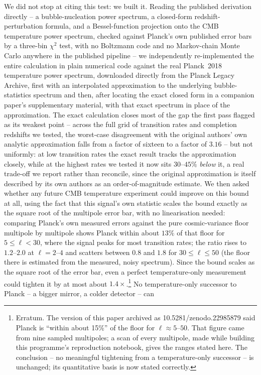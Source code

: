 \documentclass[11pt,a4paper]{article}
\begin{document}
We did not stop at citing this test: we built it. Reading the published derivation directly -- a
bubble-nucleation power spectrum, a closed-form redshift-perturbation formula, and a Bessel-function
projection onto the CMB temperature power spectrum, checked against Planck's own published error bars
by a three-bin $\chi^2$ test, with no Boltzmann code and no Markov-chain Monte Carlo anywhere in the
published pipeline -- we independently re-implemented the entire calculation in plain numerical code
against the real Planck~2018 temperature power spectrum, downloaded directly from the Planck Legacy
Archive, first with an interpolated approximation to the underlying bubble-statistics spectrum and then,
after locating the exact closed form in a companion paper's supplementary material, with that exact
spectrum in place of the approximation. The exact calculation closes most of the gap the first pass
flagged as its weakest point -- across the full grid of transition rates and completion redshifts we
tested, the worst-case disagreement with the original authors' own analytic approximation falls from a
factor of sixteen to a factor of $3.16$ -- but not uniformly: at low transition rates the exact result
tracks the approximation closely, while at the highest rates we tested it now sits $30$--$45\%$
\emph{below} it, a real trade-off we report rather than reconcile, since the original approximation is
itself described by its own authors as an order-of-magnitude estimate. We then asked whether any future
CMB temperature experiment could improve on this bound at all, using the fact that this signal's own
statistic scales the bound exactly as the square root of the multipole error bar, with no linearisation
needed: comparing Planck's own measured errors against the pure cosmic-variance floor multipole by
multipole shows Planck within about $13\%$ of that floor for $5\le\ell<30$, where the signal peaks for
most transition rates; the ratio rises to $1.2$--$2.0$ at $\ell=2$--$4$ and scatters between $0.8$ and
$1.8$ for $30\le\ell\le50$ (the floor there is estimated from the measured, noisy spectrum). Since the
bound scales as the square root of the error bar, even a perfect temperature-only measurement could
tighten it by at most about $1.4\times$.\footnote{Erratum. The version of this paper archived as
10.5281/zenodo.22985879 said Planck is ``within about 15\%'' of the floor for $\ell\approx5$--$50$. That
figure came from nine sampled multipoles; a scan of every multipole, made while building this
programme's reproduction notebook, gives the ranges stated here. The conclusion -- no meaningful
tightening from a temperature-only successor -- is unchanged; its quantitative basis is now stated
correctly.} No temperature-only successor to Planck -- a bigger mirror, a colder detector -- can
\end{document}
